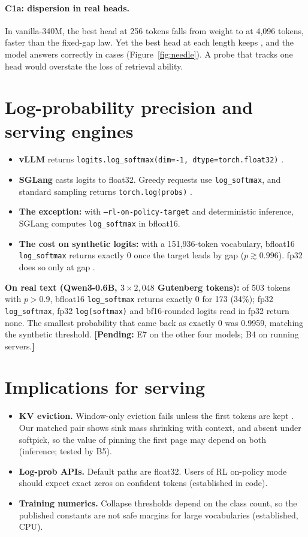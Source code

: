 \documentclass[10pt]{article}
\newcommand{\pending}[1]{\textcolor{orange!70!black}{\textbf{[Pending:} #1\textbf{]}}}
\begin{document}
\paragraph{C1a: dispersion in real heads.} In vanilla-340M, the best head at 256 tokens falls from weight \needleFixedFirstVanilla{} to \needleFixedLastVanilla{} at 4,096 tokens, faster than the fixed-gap law. Yet the best head at each length keeps \needleBestLastVanilla{}, and the model answers correctly in \needleTopOneVanilla{} cases (Figure~\ref{fig:needle}). A probe that tracks one head would overstate the loss of retrieval ability.

\section{Log-probability precision and serving engines}\label{sec:logprob}
\begin{itemize}[leftmargin=*,itemsep=1pt]
\item \textbf{vLLM} returns \texttt{logits.log\_softmax(dim=-1, dtype=torch.float32)} \citep{vllm}.
\item \textbf{SGLang} casts logits to float32. Greedy requests use \texttt{log\_softmax}, and standard sampling returns \texttt{torch.log(probs)} \citep{sglang}.
\item \textbf{The exception:} with \texttt{--rl-on-policy-target} and deterministic inference, SGLang computes \texttt{log\_softmax} in bfloat16.
\item \textbf{The cost on synthetic logits:} with a 151,936-token vocabulary, bfloat16 \texttt{log\_softmax} returns exactly 0 once the target leads by gap \logpBfGap{} ($p\gtrsim0.996$). fp32 does so only at gap \logpFpGap.
\end{itemize}
\textbf{On real text (Qwen3-0.6B, $3\times2{,}048$ Gutenberg tokens):} of 503 tokens with $p>0.9$, bfloat16 \texttt{log\_softmax} returns exactly 0 for 173 (34\%); fp32 \texttt{log\_softmax}, fp32 \texttt{log(softmax)} and bf16-rounded logits read in fp32 return none. The smallest probability that came back as exactly 0 was 0.9959, matching the synthetic threshold. \pending{E7 on the other four models; B4 on running servers.}

\section{Implications for serving}
\begin{itemize}[leftmargin=*,itemsep=1pt]
\item \textbf{KV eviction.} Window-only eviction fails unless the first tokens are kept \citep{streamingllm}. Our matched pair shows sink mass shrinking with context, and absent under softpick, so the value of pinning the first page may depend on both (inference; tested by B5).
\item \textbf{Log-prob APIs.} Default paths are float32. Users of RL on-policy mode should expect exact zeros on confident tokens (established in code).
\item \textbf{Training numerics.} Collapse thresholds depend on the class count, so the published constants are not safe margins for large vocabularies (established, CPU).
\end{itemize}
\end{document}
